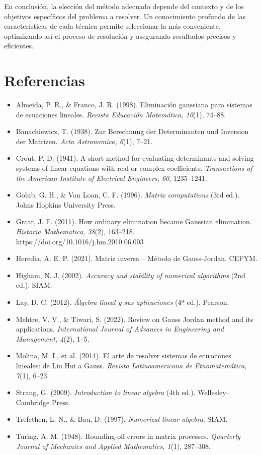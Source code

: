 \documentclass[12pt]{article}
\begin{document}
En conclusión, la elección del método adecuado depende del contexto y de los objetivos específicos del problema a resolver. Un conocimiento profundo de las características de cada técnica permite seleccionar la más conveniente, optimizando así el proceso de resolución y asegurando resultados precisos y eficientes.

\section{Referencias}

\begin{itemize}
    \item Almeida, P. R., \& Franco, J. R. (1998). Eliminación gaussiana para sistemas de ecuaciones lineales. \textit{Revista Educación Matemática, 10}(1), 74--88.
    \item Banachiewicz, T. (1938). Zur Berechnung der Determinanten und Inversion der Matrizen. \textit{Acta Astronomica, 6}(1), 7--21.
    \item Crout, P. D. (1941). A short method for evaluating determinants and solving systems of linear equations with real or complex coefficients. \textit{Transactions of the American Institute of Electrical Engineers, 60}, 1235--1241.
    \item Golub, G. H., \& Van Loan, C. F. (1996). \textit{Matrix computations} (3rd ed.). Johns Hopkins University Press.
    \item Grcar, J. F. (2011). How ordinary elimination became Gaussian elimination. \textit{Historia Mathematica, 38}(2), 163--218. https://doi.org/10.1016/j.hm.2010.06.003
    \item Heredia, A. E. P. (2021). Matriz inversa -- Método de Gauss-Jordan. CEFYM.
    \item Higham, N. J. (2002). \textit{Accuracy and stability of numerical algorithms} (2nd ed.). SIAM.
    \item Lay, D. C. (2012). \textit{Álgebra lineal y sus aplicaciones} (4ª ed.). Pearson.
    \item Mehtre, V. V., \& Tiwari, S. (2022). Review on Gauss Jordan method and its applications. \textit{International Journal of Advances in Engineering and Management, 4}(2), 1--5.
    \item Molina, M. I., et al. (2014). El arte de resolver sistemas de ecuaciones lineales: de Liu Hui a Gauss. \textit{Revista Latinoamericana de Etnomatemática, 7}(1), 6--23.
    \item Strang, G. (2009). \textit{Introduction to linear algebra} (4th ed.). Wellesley--Cambridge Press.
    \item Trefethen, L. N., \& Bau, D. (1997). \textit{Numerical linear algebra}. SIAM.
    \item Turing, A. M. (1948). Rounding-off errors in matrix processes. \textit{Quarterly Journal of Mechanics and Applied Mathematics, 1}(1), 287--308.
\end{itemize}
\end{document}
